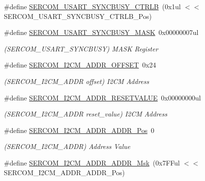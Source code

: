 \begin{DoxyCompactItemize}
\#define \mbox{\hyperlink{group___s_a_m_d21___s_e_r_c_o_m_gacb71cc03f092300eebfe4a3a31228fbd}{S\+E\+R\+C\+O\+M\+\_\+\+U\+S\+A\+R\+T\+\_\+\+S\+Y\+N\+C\+B\+U\+S\+Y\+\_\+\+C\+T\+R\+LB}}~(0x1ul $<$$<$ S\+E\+R\+C\+O\+M\+\_\+\+U\+S\+A\+R\+T\+\_\+\+S\+Y\+N\+C\+B\+U\+S\+Y\+\_\+\+C\+T\+R\+L\+B\+\_\+\+Pos)
\item 
\#define \mbox{\hyperlink{group___s_a_m_d21___s_e_r_c_o_m_ga798716a87519e0b27a62761dd72c6e9b}{S\+E\+R\+C\+O\+M\+\_\+\+U\+S\+A\+R\+T\+\_\+\+S\+Y\+N\+C\+B\+U\+S\+Y\+\_\+\+M\+A\+SK}}~0x00000007ul
\begin{DoxyCompactList}\small\item\em (S\+E\+R\+C\+O\+M\+\_\+\+U\+S\+A\+R\+T\+\_\+\+S\+Y\+N\+C\+B\+U\+SY) M\+A\+SK Register \end{DoxyCompactList}\item 
\#define \mbox{\hyperlink{group___s_a_m_d21___s_e_r_c_o_m_gac62d952a548796045e825366cd82f60a}{S\+E\+R\+C\+O\+M\+\_\+\+I2\+C\+M\+\_\+\+A\+D\+D\+R\+\_\+\+O\+F\+F\+S\+ET}}~0x24
\begin{DoxyCompactList}\small\item\em (S\+E\+R\+C\+O\+M\+\_\+\+I2\+C\+M\+\_\+\+A\+D\+DR offset) I2\+CM Address \end{DoxyCompactList}\item 
\#define \mbox{\hyperlink{group___s_a_m_d21___s_e_r_c_o_m_ga83f400f84966f4c24a17f5113a0dee63}{S\+E\+R\+C\+O\+M\+\_\+\+I2\+C\+M\+\_\+\+A\+D\+D\+R\+\_\+\+R\+E\+S\+E\+T\+V\+A\+L\+UE}}~0x00000000ul
\begin{DoxyCompactList}\small\item\em (S\+E\+R\+C\+O\+M\+\_\+\+I2\+C\+M\+\_\+\+A\+D\+DR reset\+\_\+value) I2\+CM Address \end{DoxyCompactList}\item 
\#define \mbox{\hyperlink{group___s_a_m_d21___s_e_r_c_o_m_ga80a69237a461051597db4746c45dd5a4}{S\+E\+R\+C\+O\+M\+\_\+\+I2\+C\+M\+\_\+\+A\+D\+D\+R\+\_\+\+A\+D\+D\+R\+\_\+\+Pos}}~0
\begin{DoxyCompactList}\small\item\em (S\+E\+R\+C\+O\+M\+\_\+\+I2\+C\+M\+\_\+\+A\+D\+DR) Address Value \end{DoxyCompactList}\item 
\#define \mbox{\hyperlink{group___s_a_m_d21___s_e_r_c_o_m_ga2d6fa8e1a0522f1375e8964949d80636}{S\+E\+R\+C\+O\+M\+\_\+\+I2\+C\+M\+\_\+\+A\+D\+D\+R\+\_\+\+A\+D\+D\+R\+\_\+\+Msk}}~(0x7\+F\+Ful $<$$<$ S\+E\+R\+C\+O\+M\+\_\+\+I2\+C\+M\+\_\+\+A\+D\+D\+R\+\_\+\+A\+D\+D\+R\+\_\+\+Pos)
\item 

\end{DoxyCompactItemize}

